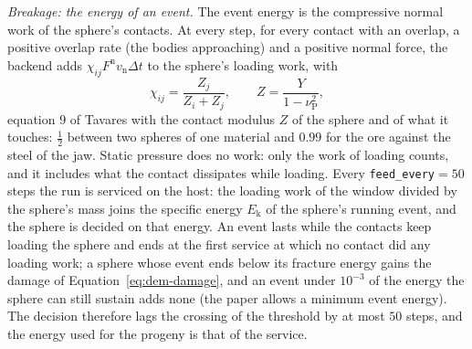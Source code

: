 \emph{Breakage: the energy of an event.} The event energy is the compressive normal work of the sphere's contacts. At every step, for every contact with an overlap, a positive overlap rate
(the bodies approaching) and a positive normal force, the backend adds $\chi_{ij}F^{\mathrm n}v_{\mathrm n}\Delta t$ to the sphere's loading work, with
\begin{equation}
\chi_{ij}=\frac{Z_j}{Z_i+Z_j},\qquad Z=\frac{Y}{1-\nu_{\mathrm P}^2},
\label{eq:dem-event}
\end{equation}
equation 9 of Tavares with the contact modulus $Z$ of the sphere and of what it touches: $\tfrac12$ between two spheres of one material and $0.99$ for the ore against the steel of the jaw. Static pressure does no work: only the work of loading counts, and it includes what the
contact dissipates while loading. Every \texttt{feed\_every}$=50$ steps the run is serviced on the host: the loading work of the window divided by the sphere's mass joins the specific energy $E_{\mathrm k}$ of the sphere's running event, and the sphere is decided on that
energy. An event lasts while the contacts keep loading the sphere and ends at the first service at which no contact did any loading work; a sphere whose event ends below its fracture energy gains the damage of Equation~\eqref{eq:dem-damage}, and an event under $10^{-3}$ of the
energy the sphere can still sustain adds none (the paper allows a minimum event energy). The decision therefore lags the crossing of the threshold by at most $50$ steps, and the energy used for the progeny is that of the service.

